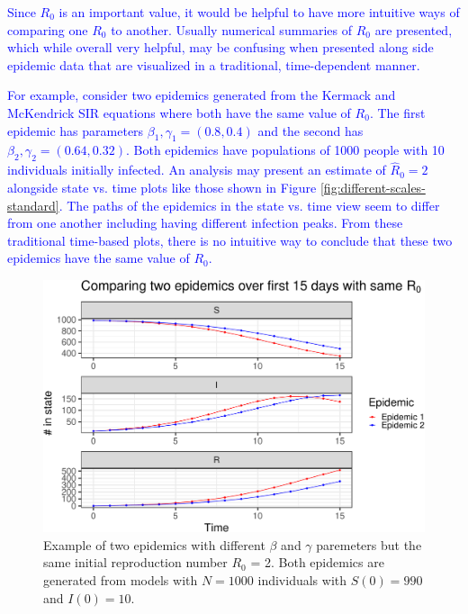 \documentclass[
  shortnames]{jss}
\begin{document}
\textcolor{blue}{Since $R_0$ is an important value, it would be helpful to have more intuitive ways of comparing one $R_0$ to another.  Usually numerical summaries of $R_0$ are presented, which while overall very helpful, may be confusing when presented along side epidemic data that are visualized in a traditional, time-dependent manner.}

\textcolor{blue}{For example, consider two epidemics generated from the Kermack and McKendrick SIR equations where both have the same value of $R_0$. The first epidemic has parameters $\beta_1, \gamma_1 = (0.8,0.4)$ and the second has $\beta_2, \gamma_2 = (0.64,0.32)$.  Both epidemics have populations of 1000 people with 10 individuals initially infected. An analysis may present an estimate of $\hat{R}_0 = 2$ alongside state vs. time plots like those shown in Figure \ref{fig:different-scales-standard}. The paths of the epidemics in the state vs. time view seem to differ from one another including having different infection peaks. From these traditional time-based plots, there is no intuitive way to conclude that these two epidemics have the same value of $R_0$.}

\begin{CodeChunk}
\begin{figure}[H]

{\centering \includegraphics{Figs/unnamed-chunk-2-1} 

}

\caption{\label{fig:different-scales-standard}Example of two epidemics with different $\beta$ and $\gamma$ paremeters but the same initial reproduction number $R_0$ = 2.  Both epidemics are generated from models with $N= 1000$ individuals with $S(0) = 990$ and $I(0) = 10$.}\label{fig:unnamed-chunk-2}
\end{figure}
\end{CodeChunk}
\end{document}
